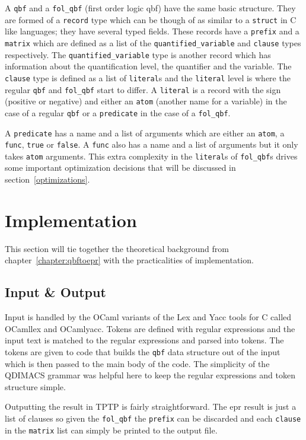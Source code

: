 A \texttt{qbf} and a \texttt{fol\_qbf} (first order logic \gls{qbf}) have the same basic structure. They are formed of a \texttt{record} type which can be though of as similar to a \texttt{struct} in C like languages; they have several typed fields. These records have a \texttt{prefix} and a \texttt{matrix} which are defined as a list of the \texttt{quantified\_variable} and \texttt{clause} types respectively. The \texttt{quantified\_variable} type is another record which has information about the quantification level, the quantifier and the variable. The \texttt{clause} type is defined as a list of \texttt{literal}s and the \texttt{literal} level is where the regular \texttt{qbf} and \texttt{fol\_qbf} start to differ. A \texttt{literal} is a record with the sign (positive or negative) and either an \texttt{atom} (another name for a variable) in the case of a regular \texttt{qbf} or a \texttt{predicate} in the case of a \texttt{fol\_qbf}.

A \texttt{predicate} has a name and a list of arguments which are either an \texttt{atom}, a \texttt{func}, \texttt{true} or \texttt{false}. A \texttt{func} also has a name and a list of arguments but it only takes \texttt{atom} arguments. This extra complexity in the \texttt{literal}s of \texttt{fol\_qbf}s drives some important optimization decisions that will be discussed in section~\ref{optimizations}.

\section{Implementation}
This section will tie together the theoretical background from chapter~\ref{chapter:qbftoepr} with the practicalities of implementation.

\subsection{Input \& Output}
Input is handled by the OCaml variants of the Lex and Yacc tools for C called OCamllex and OCamlyacc. Tokens are defined with regular expressions and the input text is matched to the regular expressions and parsed into tokens. The tokens are given to code that builds the \texttt{qbf} data structure out of the input which is then passed to the main body of the code. The simplicity of the QDIMACS grammar was helpful here to keep the regular expressions and token structure simple.

Outputting the result in TPTP is fairly straightforward. The \gls{epr} result is just a list of clauses so given the \texttt{fol\_qbf} the \texttt{prefix} can be discarded and each \texttt{clause} in the \texttt{matrix} list can simply be printed to the output file.


